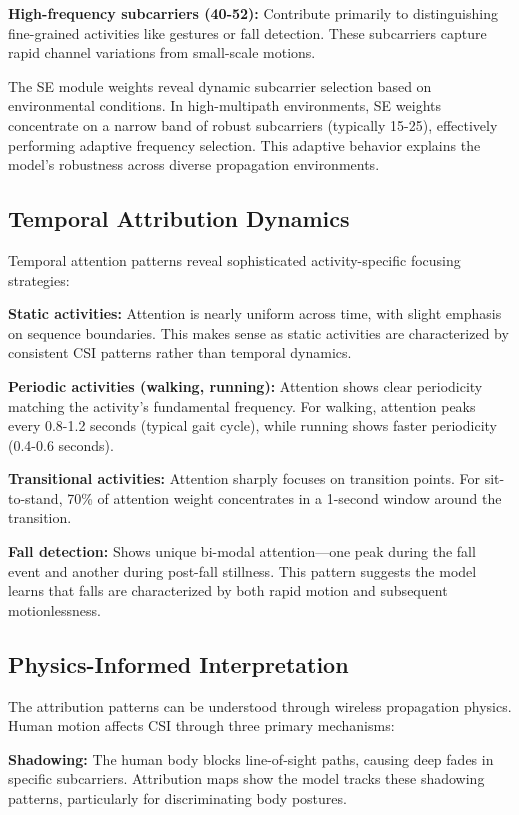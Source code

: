 \documentclass[lettersize,journal]{IEEEtran}
\begin{document}
\textbf{High-frequency subcarriers (40-52):} Contribute primarily to distinguishing fine-grained activities like gestures or fall detection. These subcarriers capture rapid channel variations from small-scale motions.

The SE module weights reveal dynamic subcarrier selection based on environmental conditions. In high-multipath environments, SE weights concentrate on a narrow band of robust subcarriers (typically 15-25), effectively performing adaptive frequency selection. This adaptive behavior explains the model's robustness across diverse propagation environments.

\subsection{Temporal Attribution Dynamics}

Temporal attention patterns reveal sophisticated activity-specific focusing strategies:

\textbf{Static activities:} Attention is nearly uniform across time, with slight emphasis on sequence boundaries. This makes sense as static activities are characterized by consistent CSI patterns rather than temporal dynamics.

\textbf{Periodic activities (walking, running):} Attention shows clear periodicity matching the activity's fundamental frequency. For walking, attention peaks every 0.8-1.2 seconds (typical gait cycle), while running shows faster periodicity (0.4-0.6 seconds).

\textbf{Transitional activities:} Attention sharply focuses on transition points. For sit-to-stand, 70\% of attention weight concentrates in a 1-second window around the transition.

\textbf{Fall detection:} Shows unique bi-modal attention—one peak during the fall event and another during post-fall stillness. This pattern suggests the model learns that falls are characterized by both rapid motion and subsequent motionlessness.

\subsection{Physics-Informed Interpretation}

The attribution patterns can be understood through wireless propagation physics. Human motion affects CSI through three primary mechanisms:

\textbf{Shadowing:} The human body blocks line-of-sight paths, causing deep fades in specific subcarriers. Attribution maps show the model tracks these shadowing patterns, particularly for discriminating body postures.
\end{document}
